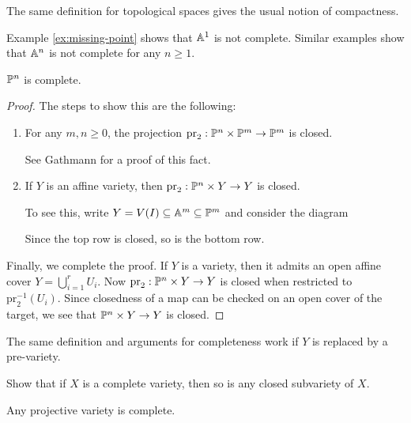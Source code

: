 \begin{remark}
  The same definition for
  topological spaces
  gives the usual notion of
  compactness.
\end{remark}

\begin{example}
  Example \ref{ex:missing-point} shows that
  $\mathbb{A}^1$ is not complete.
  Similar examples show that
  $\mathbb{A}^n$ is not complete for any
  $n \ge 1$.
\end{example}

\begin{prop}
  $\mathbb{P}^n$ is complete.
\end{prop}

\begin{proof}
  The steps to show this are the following:
  \begin{enumerate}
    \item For any $m, n \ge 0$,
      the projection
      $\mathrm{pr}_2 : \mathbb{P}^n \times \mathbb{P}^m \to \mathbb{P}^m$
      is closed.

      See Gathmann for a proof of this
      fact.
    \item If $Y$ is an affine variety,
      then
      $\mathrm{pr}_2 : \mathbb{P}^n \times Y \to Y$
      is closed.

      To see this, write
      $Y = V(I) \subseteq \mathbb{A}^m \subseteq \mathbb{P}^m$
      and consider the diagram
      \begin{center}
      \end{center}
      Since the top row is closed, so
      is the bottom row.
  \end{enumerate}
  Finally, we complete the proof.
  If $Y$ is a variety, then it admits an
  open affine cover
  $Y = \bigcup_{i = 1}^r U_i$. Now
  $\mathrm{pr}_2 : \mathbb{P}^n \times Y \to Y$
  is closed when restricted to
  $\mathrm{pr}_2^{-1}(U_i)$. Since
  closedness of a map can be checked on
  an open cover of the target,
  we see that $\mathbb{P}^n \times Y \to Y$
  is closed.
\end{proof}

\begin{remark}
  The same definition and
  arguments for completeness work if
  $Y$ is replaced by a pre-variety.
\end{remark}

\begin{exercise}
  Show that if $X$ is a complete variety,
  then so is any closed subvariety of
  $X$.
\end{exercise}

\begin{corollary}
  Any projective variety is complete.
\end{corollary}
